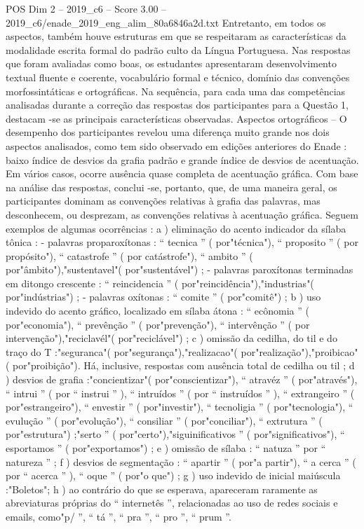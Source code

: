\begin{textsample}{POS Dim 2 – 2019\_c6 – Score 3.00 – 2019\_c6/enade\_2019\_eng\_alim\_80a6846a2d.txt}
Entretanto, em todos os aspectos, também houve estruturas em que se respeitaram as características da modalidade escrita formal do padrão culto da Língua Portuguesa.
Nas respostas que foram avaliadas como boas, os estudantes apresentaram desenvolvimento textual fluente e coerente, vocabulário formal e técnico, domínio das convenções morfossintáticas e ortográficas.
Na sequência, para cada uma das competências analisadas durante a correção das respostas dos participantes para a Questão 1, destacam -se as principais características observadas.
Aspectos ortográficos – O desempenho dos participantes revelou uma diferença muito grande nos dois aspectos analisados, como tem sido observado em edições anteriores do Enade : baixo índice de desvios da grafia padrão e grande índice de desvios de acentuação.
Em vários casos, ocorre ausência quase completa de acentuação gráfica.
Com base na análise das respostas, conclui -se, portanto, que, de uma maneira geral, os participantes dominam as convenções relativas à grafia das palavras, mas desconhecem, ou desprezam, as convenções relativas à acentuação gráfica.
Seguem exemplos de algumas ocorrências : a ) eliminação do acento indicador da sílaba tônica : - palavras proparoxítonas : “ tecnica ” ( por"técnica"), “ proposito ” ( por propósito"), “ catastrofe ” ( por catástrofe"), “ ambito ” ( por"âmbito"),"sustentavel"( por"sustentável") ; - palavras paroxítonas terminadas em ditongo crescente : “ reincidencia ” ( por"reincidência"),"industrias"( por"indústrias") ; - palavras oxítonas : “ comite ” ( por"comitê") ; b ) uso indevido do acento gráfico, localizado em sílaba átona : “ ecônomia ” ( por"economia"), “ prevênção ” ( por"prevenção"), “ intervênção ” ( por intervenção"),"reciclavél"( por"reciclável") ; c ) omissão da cedilha, do til e do traço do T :"seguranca"( por"segurança"),"realizacao"( por"realização"),"proibicao"( por"proibição").
Há, inclusive, respostas com ausência total de cedilha ou til ; d ) desvios de grafia :"concientizar"( por"conscientizar"), “ atravéz ” ( por"através"), “ intrui ” ( por “ instrui ” ), “ intruídos ” ( por “ instruídos ” ), “ extrangeiro ” ( por"estrangeiro"), “ envestir ” ( por"investir"), “ tecnoligia ” ( por"tecnologia"), “ evulução ” ( por"evolução"), “ consiliar ” ( por"conciliar"), “ extrutura ” ( por"estrutura") ;"serto ” ( por"certo"),"siguinificativos ” ( por"significativos"), “ esportamos ” ( por"exportamos") ; e ) omissão de sílaba : “ natuza ” por “ natureza ” ; f ) desvios de segmentação : “ apartir ” ( por"a partir"), “ a cerca ” ( por “ acerca ” ), “ oque ” ( por"o que") ; g ) uso indevido de inicial maiúscula :"Boletos"; h ) ao contrário do que se esperava, apareceram raramente as abreviaturas próprias do “ internetês ”, relacionadas ao uso de redes sociais e emails, como"p/ ”, “ tá ”, “ pra ”, “ pro ”, “ prum ”.

\end{textsample}
